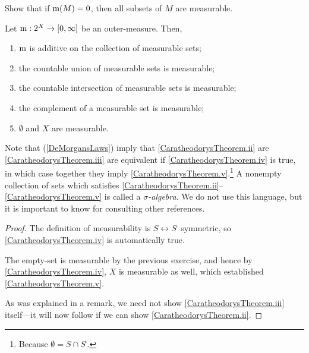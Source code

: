 \begin{exr}
Show that if $\mathrm{m} (M)=0$, then all subsets of $M$ are measurable.
\end{exr}

\begin{thm}\label{CaratheodorysTheorem}
\begin{savenotes}
Let $\mathrm{m} :2^X\rightarrow [0,\infty ]$ be an outer-measure.  Then,
\begin{enumerate}
\item \label{CaratheodorysTheorem.i}$\mathrm{m}$ is additive on the collection of measurable sets;
\item \label{CaratheodorysTheorem.ii}the countable union of measurable sets is measurable;
\item \label{CaratheodorysTheorem.iii}the countable intersection of measurable sets is measurable;
\item \label{CaratheodorysTheorem.iv}the complement of a measurable set is measurable;
\item \label{CaratheodorysTheorem.v}$\emptyset$ and $X$ are measurable.
\end{enumerate}
\begin{rmk}
Note that  (\cref{DeMorgansLaws}) imply that \ref{CaratheodorysTheorem.ii} are \ref{CaratheodorysTheorem.iii} are equivalent if \ref{CaratheodorysTheorem.iv} is true, in which case together they imply \ref{CaratheodorysTheorem.v}.\footnote{Because $\emptyset =S\cap S^{\comp}$.}  A nonempty collection of sets which satisfies \ref{CaratheodorysTheorem.ii}--\ref{CaratheodorysTheorem.v} is called a \emph{$\sigma$-algebra}.  We do not use this language, but it is important to know for consulting other references.
\end{rmk}
\begin{proof}
The definition of measurability is $S\leftrightarrow S^{\comp}$ symmetric, so \ref{CaratheodorysTheorem.iv} is automatically true.

The empty-set is measurable by the previous exercise, and hence by \ref{CaratheodorysTheorem.iv}, $X$ is measurable as well, which established \ref{CaratheodorysTheorem.v}.

As was explained in a remark, we need not show \ref{CaratheodorysTheorem.iii} itself---it will now follow if we can show \ref{CaratheodorysTheorem.ii}.


\end{proof}
\end{savenotes}
\end{thm}
